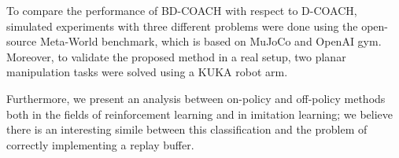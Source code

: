 \vspace{3mm} %

To compare the performance of BD-COACH with respect to D-COACH, simulated experiments with three different problems were done using the open-source Meta-World benchmark, which is based on MuJoCo and OpenAI gym. Moreover, to validate the proposed method in a real setup, two planar manipulation tasks were solved using a KUKA robot arm. 

\vspace{3mm} %


Furthermore, we present an analysis between on-policy and off-policy methods both in the fields of reinforcement learning and in imitation learning; we believe there is an interesting simile between this classification and the problem of correctly implementing a replay buffer.